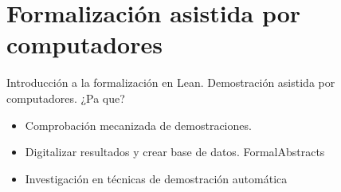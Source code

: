 \section{Formalización asistida por computadores}

Introducción a la formalización en Lean. Demostración asistida por computadores. ¿Pa que?
\begin{itemize}
	\item Comprobación mecanizada de demostraciones.
	\item Digitalizar resultados y crear base de datos.
	      FormalAbstracts
	\item Investigación en técnicas de demostración automática
\end{itemize}


